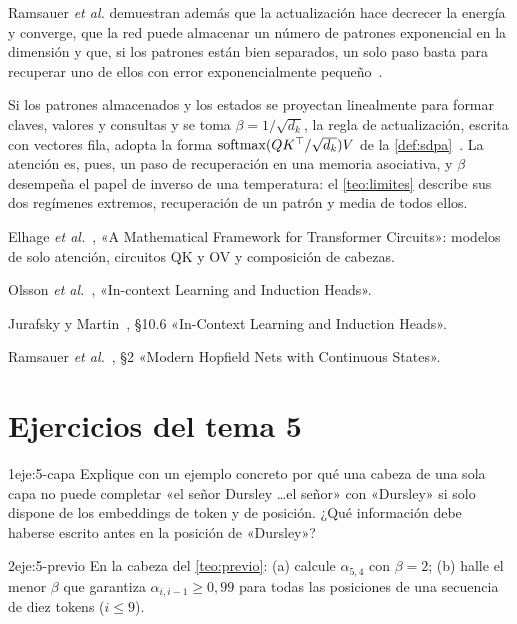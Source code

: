 Ramsauer \emph{et al.} demuestran además que la actualización hace decrecer la energía y converge, que la red puede almacenar un número de patrones exponencial en la dimensión y que, si los patrones están bien separados, un solo paso basta para recuperar uno de ellos con error exponencialmente pequeño~\cite[§2, teoremas~1 a~5]{ramsauer}.

\begin{observacion}
Si los patrones almacenados y los estados se proyectan linealmente para formar claves, valores y consultas y se toma $\beta=1/\sqrt{d_k}$, la regla de actualización, escrita con vectores fila, adopta la forma $\operatorname{softmax}(QK^{\top}/\sqrt{d_k})V$ de la \cref{def:sdpa}~\cite[§2]{ramsauer}. La atención es, pues, un paso de recuperación en una memoria asociativa, y $\beta$ desempeña el papel de inverso de una temperatura: el \cref{teo:limites} describe sus dos regímenes extremos, recuperación de un patrón y media de todos ellos.
\end{observacion}

\begin{lecturas}
\item Elhage \emph{et al.}~\cite{elhage}, «A Mathematical Framework for Transformer Circuits»: modelos de solo atención, circuitos QK y OV y composición de cabezas.
\item Olsson \emph{et al.}~\cite{olsson}, «In-context Learning and Induction Heads».
\item Jurafsky y Martin~\cite{jm3}, §10.6 «In-Context Learning and Induction Heads».
\item Ramsauer \emph{et al.}~\cite{ramsauer}, §2 «Modern Hopfield Nets with Continuous States».
\end{lecturas}

\section*{Ejercicios del tema 5}

\begin{ejercicio}{1}{eje:5-capa}
Explique con un ejemplo concreto por qué una cabeza de una sola capa no puede completar «el señor Dursley \dots el señor» con «Dursley» si solo dispone de los embeddings de token y de posición. ¿Qué información debe haberse escrito antes en la posición de «Dursley»?
\end{ejercicio}

\begin{ejercicio}{2}{eje:5-previo}
En la cabeza del \cref{teo:previo}: (a) calcule $\alpha_{5,4}$ con $\beta=2$; (b) halle el menor $\beta$ que garantiza $\alpha_{i,i-1}\ge 0{,}99$ para todas las posiciones de una secuencia de diez tokens ($i\le 9$).
\end{ejercicio}

